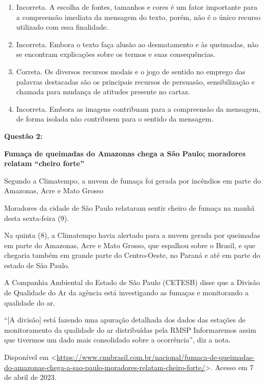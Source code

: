{\begin{enumerate}
\def\labelenumi{\arabic{enumi}.}
\item
  Incorreta. A escolha de fontes, tamanhos e cores é um fator importante
  para a compreensão imediata da mensagem do texto, porém, não é o único
  recurso utilizado com essa finalidade.
\item
  Incorreta. Embora o texto faça alusão ao desmatamento e às queimadas,
  não se encontram explicações sobre os termos e suas consequências.
\item
  Correta. Os diversos recursos modais e o jogo de sentido no emprego
  das palavras destacadas são os principais recursos de persuasão,
  sensibilização e chamada para mudança de atitudes presente no cartaz.
\item
  Incorreta. Embora as imagens contribuam para a compreensão da
  mensagem, de forma isolada não contribuem para o sentido da mensagem.
\end{enumerate}

\textbf{Questão 2:}

\textbf{Fumaça de queimadas do Amazonas chega a São Paulo; moradores
relatam ``cheiro forte''}

Segundo a Climatempo, a nuvem de fumaça foi gerada por incêndios em
parte do Amazonas, Acre e Mato Grosso

Moradores da cidade de São Paulo relataram sentir cheiro de fumaça na
manhã desta sexta-feira (9).

Na quinta (8), a Climatempo havia alertado para a nuvem gerada por
queimadas em parte do Amazonas, Acre e Mato Grosso, que espalhou sobre o
Brasil, e que chegaria também em grande parte do Centro-Oeste, no Paraná
e até em parte do estado de São Paulo.

A Companhia Ambiental do Estado de São Paulo (CETESB) disse que a
Divisão de Qualidade do Ar da agência está investigando as fumaças e
monitorando a qualidade do ar.

``{[}A divisão{]} está fazendo uma apuração detalhada dos dados das
estações de monitoramento da qualidade do ar distribuídas pela RMSP
Informaremos assim que tivermos um dado mais consolidado sobre a
ocorrência'', diz a nota.

Disponível em
\textless{}\href{https://www.cnnbrasil.com.br/nacional/fumaca-de-queimadas-do-amazonas-chega-a-sao-paulo-moradores-relatam-cheiro-forte/}{\uline{https://www.cnnbrasil.com.br/nacional/fumaca-de-queimadas-do-amazonas-chega-a-sao-paulo-moradores-relatam-cheiro-forte/}}\textgreater.
Acesso em 7 de abril de 2023.

}

